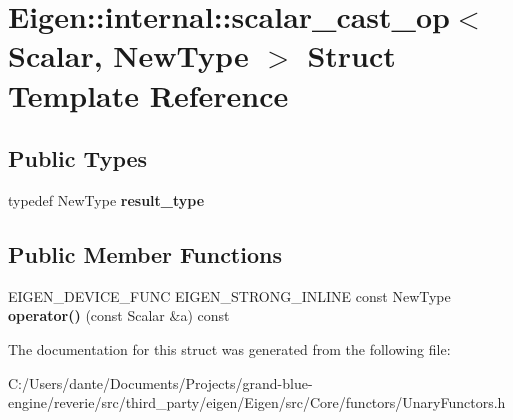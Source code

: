 \hypertarget{struct_eigen_1_1internal_1_1scalar__cast__op}{}\section{Eigen\+::internal\+::scalar\+\_\+cast\+\_\+op$<$ Scalar, New\+Type $>$ Struct Template Reference}
\label{struct_eigen_1_1internal_1_1scalar__cast__op}
\subsection*{Public Types}
\begin{DoxyCompactItemize}
\item 
\mbox{\label{struct_eigen_1_1internal_1_1scalar__cast__op_a23d6b1bfca1b90cba6c16f62a6305b02}} 
typedef New\+Type {\bfseries result\+\_\+type}
\end{DoxyCompactItemize}
\subsection*{Public Member Functions}
\begin{DoxyCompactItemize}
\item 
\mbox{\label{struct_eigen_1_1internal_1_1scalar__cast__op_a2079c49e97a191b26a150b07e2a19e98}} 
E\+I\+G\+E\+N\+\_\+\+D\+E\+V\+I\+C\+E\+\_\+\+F\+U\+NC E\+I\+G\+E\+N\+\_\+\+S\+T\+R\+O\+N\+G\+\_\+\+I\+N\+L\+I\+NE const New\+Type {\bfseries operator()} (const Scalar \&a) const
\end{DoxyCompactItemize}


The documentation for this struct was generated from the following file\+:\begin{DoxyCompactItemize}
\item 
C\+:/\+Users/dante/\+Documents/\+Projects/grand-\/blue-\/engine/reverie/src/third\+\_\+party/eigen/\+Eigen/src/\+Core/functors/Unary\+Functors.\+h\end{DoxyCompactItemize}
